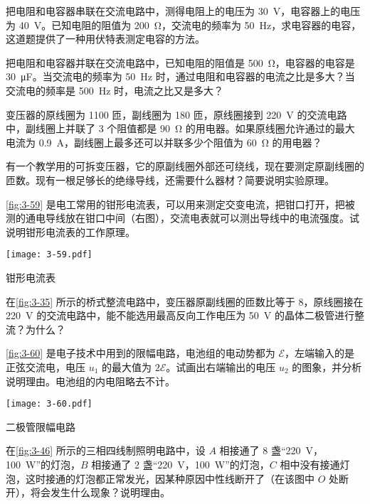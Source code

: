 \begin{Exercise}
\begin{question}
  \item 把电阻和电容器串联在交流电路中，测得电阻上的电压为 \qty{30}{V}，电容器上的电压为 \qty{40}{V}。已知电阻的阻值为 \qty{200}{\ohm}，交流电的频率为 \qty{50}{Hz}，求电容器的电容，这道题提供了一种用伏特表测定电容的方法。
  \item 把电阻和电容器并联在交流电路中，已知电阻的阻值是 \qty{500}{\ohm}，电容器的电容是 \qty{30}{\micro F}。当交流电的频率为 \qty{50}{Hz} 时，通过电阻和电容器的电流之比是多大？当交流电的频率是 \qty{500}{Hz} 时，电流之比又是多大？
  \item 变压器的原线圈为 1100 匝，副线圈为 180 匝，原线圈接到 \qty{220}{V} 的交流电路中，副线圈上并联了 3 个阻值都是 \qty{90}{\ohm} 的用电器。如果原线圈允许通过的最大电流为 \qty{0.9}{A}，副线圈上最多还可以并联多少个阻值为 \qty{60}{\ohm} 的用电器？
  \item 有一个教学用的可拆变压器，它的原副线圈外部还可绕线，现在要测定原副线圈的匝数。现有一根足够长的绝缘导线，还需要什么器材？简要说明实验原理。
  \item \cref{fig:3-59} 是电工常用的钳形电流表，可以用来测定交变电流，把钳口打开，把被测的通电导线放在钳口中间（右图），交流电表就可以测出导线中的电流强度。试说明钳形电流表的工作原理。
  \begin{figurehere}
    \begin{minipage}{\linewidth}\centering
      \texttt{[image: 3-59.pdf]}
      \caption{钳形电流表}\label{fig:3-59}
    \end{minipage}
  \end{figurehere}
  \item 在\cref{fig:3-35} 所示的桥式整流电路中，变压器原副线圈的匝数比等于 8，原线圈接在 \qty{220}{V} 的交流电路中，能不能选用最高反向工作电压为 \qty{50}{V} 的晶体二极管进行整流？为什么？
  \item \cref{fig:3-60} 是电子技术中用到的限幅电路，电池组的电动势都为 $\mathcal{E}$，左端输入的是正弦交流电，电压 $u_1$ 的最大值为 $2\mathcal{E}$。试画出右端输出的电压 $u_2$ 的图象，并分析说明理由。电池组的内电阻略去不计。
  \begin{figurehere}
    \begin{minipage}{\linewidth}\centering
      \texttt{[image: 3-60.pdf]}
      \caption{二极管限幅电路}\label{fig:3-60}
    \end{minipage}
  \end{figurehere}
  \item 在\cref{fig:3-46} 所示的三相四线制照明电路中，设 $A$ 相接通了 8 盏“\qty{220}{V}，\qty{100}{W}”的灯泡，$B$ 相接通了 2 盏“\qty{220}{V}，\qty{100}{W}”的灯泡，$C$ 相中没有接通灯泡，这时接通的灯泡都正常发光，因某种原因中性线断开了（在该图中 $O$ 处断开），将会发生什么现象？说明理由。
    

\end{question}
\end{Exercise}
